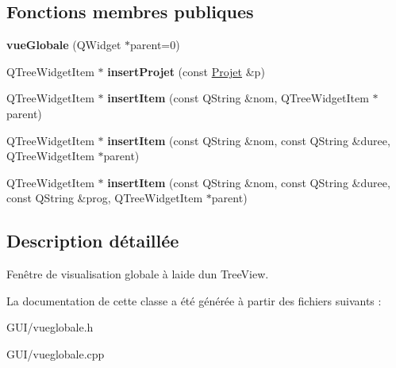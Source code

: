 \subsection*{Fonctions membres publiques}
\begin{DoxyCompactItemize}
\item 
\hypertarget{classvue_globale_a6bff14519ecc6449dd50c0a64fc1027b}{}{\bfseries vue\+Globale} (Q\+Widget $\ast$parent=0)\label{classvue_globale_a6bff14519ecc6449dd50c0a64fc1027b}

\item 
\hypertarget{classvue_globale_a644d1fdbb22daebc35dc7e530b66166b}{}Q\+Tree\+Widget\+Item $\ast$ {\bfseries insert\+Projet} (const \hyperlink{class_projet}{Projet} \&p)\label{classvue_globale_a644d1fdbb22daebc35dc7e530b66166b}

\item 
\hypertarget{classvue_globale_a7943572f94eefd6018be233f563029f4}{}Q\+Tree\+Widget\+Item $\ast$ {\bfseries insert\+Item} (const Q\+String \&nom, Q\+Tree\+Widget\+Item $\ast$parent)\label{classvue_globale_a7943572f94eefd6018be233f563029f4}

\item 
\hypertarget{classvue_globale_ae27c01d8d51aa88a6f181ea9f89bdd71}{}Q\+Tree\+Widget\+Item $\ast$ {\bfseries insert\+Item} (const Q\+String \&nom, const Q\+String \&duree, Q\+Tree\+Widget\+Item $\ast$parent)\label{classvue_globale_ae27c01d8d51aa88a6f181ea9f89bdd71}

\item 
\hypertarget{classvue_globale_a28f35c6d40e0beb35c306a639f2be5e0}{}Q\+Tree\+Widget\+Item $\ast$ {\bfseries insert\+Item} (const Q\+String \&nom, const Q\+String \&duree, const Q\+String \&prog, Q\+Tree\+Widget\+Item $\ast$parent)\label{classvue_globale_a28f35c6d40e0beb35c306a639f2be5e0}

\end{DoxyCompactItemize}


\subsection{Description détaillée}
Fenêtre de visualisation globale à l\textquotesingle{}aide d\textquotesingle{}un Tree\+View. 

La documentation de cette classe a été générée à partir des fichiers suivants \+:\begin{DoxyCompactItemize}
\item 
G\+U\+I/vueglobale.\+h\item 
G\+U\+I/vueglobale.\+cpp\end{DoxyCompactItemize}
